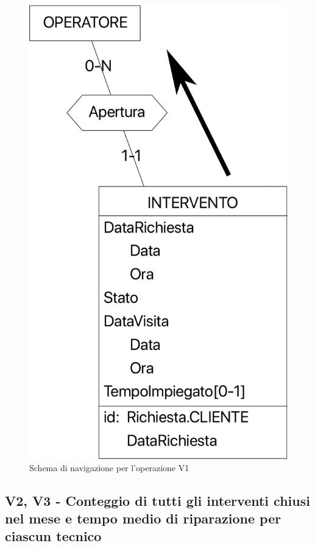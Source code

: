 \documentclass[a4paper, 12pt]{report}
\begin{document}
\begin{figure}[H]
	\centering
	\includegraphics{images/V1.png}
	\caption{Schema di navigazione per l'operazione V1}
\end{figure}

\subsection{V2, V3 - Conteggio di tutti gli interventi chiusi nel mese e tempo medio di riparazione per ciascun tecnico}
\end{document}
